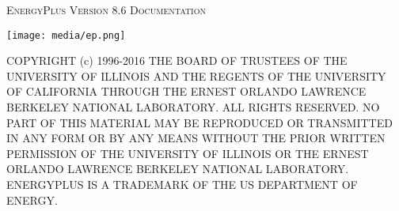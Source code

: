 \makeatletter
\begin{titlepage}
  \begin{center}
    {\scshape\LARGE EnergyPlus\texttrademark{} Version 8.6 Documentation \par}
    \vspace{1.5cm}
    {\bfseries\huge \@title \par}
    \vspace{1.5cm}
    {\Large\itshape \@author \par}
    \vspace{2.5cm}
    \texttt{[image: media/ep.png]}\par\vspace{1cm}
    \vfill

    {\large \@date \par}
    \vspace{1.5cm}
  \end{center}
  {\small
COPYRIGHT (c) 1996-2016 THE BOARD OF TRUSTEES OF THE UNIVERSITY OF ILLINOIS AND THE REGENTS OF THE UNIVERSITY OF CALIFORNIA THROUGH THE ERNEST ORLANDO LAWRENCE BERKELEY NATIONAL LABORATORY. ALL RIGHTS RESERVED. NO PART OF THIS MATERIAL MAY BE REPRODUCED OR TRANSMITTED IN ANY FORM OR BY ANY MEANS WITHOUT THE PRIOR WRITTEN PERMISSION OF THE UNIVERSITY OF ILLINOIS OR THE ERNEST ORLANDO LAWRENCE BERKELEY NATIONAL LABORATORY. ENERGYPLUS IS A TRADEMARK OF THE US DEPARTMENT OF ENERGY.
  }
\end{titlepage}
\makeatother

{
\setcounter{tocdepth}{2}
\tableofcontents
}

\hypertarget{generated-toc}{}
